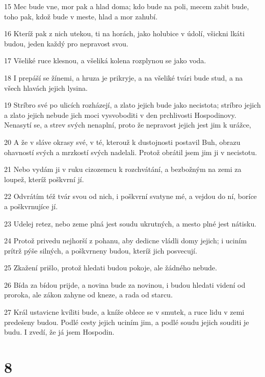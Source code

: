 \par 15 Mec bude vne, mor pak a hlad doma; kdo bude na poli, mecem zabit bude, toho pak, kdož bude v meste, hlad a mor zahubí.
\par 16 Kteríž pak z nich utekou, ti na horách, jako holubice v údolí, všickni lkáti budou, jeden každý pro nepravost svou.
\par 17 Všeliké ruce klesnou, a všeliká kolena rozplynou se jako voda.
\par 18 I prepáší se žínemi, a hruza je prikryje, a na všeliké tvári bude stud, a na všech hlavách jejich lysina.
\par 19 Stríbro své po ulicích rozházejí, a zlato jejich bude jako necistota; stríbro jejich a zlato jejich nebude jich moci vysvoboditi v den prchlivosti Hospodinovy. Nenasytí se, a strev svých nenaplní, proto že nepravost jejich jest jim k urážce,
\par 20 A že v sláve okrasy své, v té, kterouž k dustojnosti postavil Buh, obrazu ohavností svých a mrzkostí svých nadelali. Protož obrátil jsem jim ji v necistotu.
\par 21 Nebo vydám ji v ruku cizozemcu k rozchvátání, a bezbožným na zemi za loupež, kteríž poškvrní jí.
\par 22 Odvrátím též tvár svou od nich, i poškvrní svatyne mé, a vejdou do ní, boríce a poškvrnujíce jí.
\par 23 Udelej retez, nebo zeme plná jest soudu ukrutných, a mesto plné jest nátisku.
\par 24 Protož privedu nejhorší z pohanu, aby dedicne vládli domy jejich; i uciním prítrž pýše silných, a poškvrneny budou, kteríž jich posvecují.
\par 25 Zkažení prišlo, protož hledati budou pokoje, ale žádného nebude.
\par 26 Bída za bídou prijde, a novina bude za novinou, i budou hledati videní od proroka, ale zákon zahyne od kneze, a rada od starcu.
\par 27 Král ustavicne kvíliti bude, a kníže oblece se v smutek, a ruce lidu v zemi predešeny budou. Podlé cesty jejich uciním jim, a podlé soudu jejich souditi je budu. I zvedí, že já jsem Hospodin.

\chapter{8}


